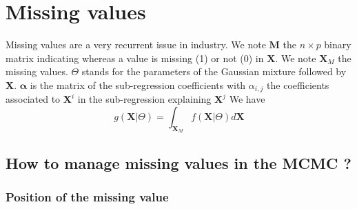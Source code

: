 \documentclass[11pt,a4paper]{report}
\begin{document}
\chapter{Missing values}
	Missing values are a very recurrent issue in industry. We note $\boldsymbol{M}$ the $n\times p$ binary matrix indicating whereas a value is missing (1) or not (0) in $\boldsymbol{X}$.
	We note $\boldsymbol{X}_M$ the missing values. $\Theta$ stands for the parameters of the Gaussian mixture followed by $\boldsymbol{X}$.
	$\boldsymbol{\alpha}$ is the matrix of the sub-regression coefficients with $\alpha_{i,j}$ the coefficients associated to $\boldsymbol{X}^i$ in the sub-regression explaining $\boldsymbol{X}^j$
	We have 
	\begin{equation}
		g(\boldsymbol{X}|\Theta)=\int_{\boldsymbol{X}_M}f(\boldsymbol{X}|\Theta)d \boldsymbol{X}
	\end{equation}
	\section{How to manage missing values in the MCMC ?}
			\subsection{Position of the missing value}
\end{document}

